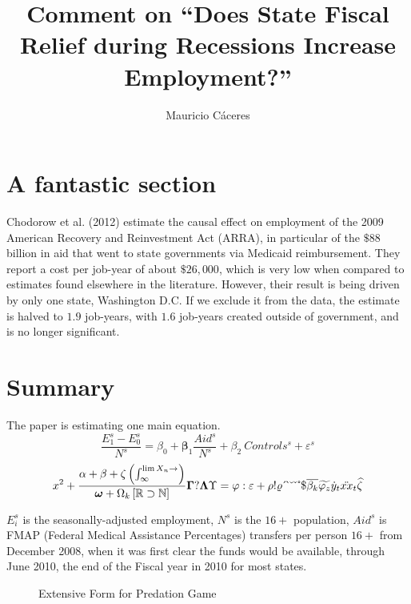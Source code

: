 \documentclass{article}
\title{Comment on ``Does State Fiscal Relief during Recessions Increase Employment?''}
\author{Mauricio C\'aceres}
\begin{document}
\displayoptions

\section{A fantastic section}
\label{sec:a_fantastic_section}

Chodorow et al. (2012) estimate the causal effect on employment of the 2009 American Recovery and Reinvestment Act (ARRA), in particular of the $\$88$ billion in aid that went to state governments via Medicaid reimbursement. They report a cost per job-year of about $\$26,000$, which is very low when compared to estimates found elsewhere in the literature. However, their result is being driven by only one state, Washington D.C. If we exclude it from the data, the estimate is halved to $1.9$ job-years, with $1.6$ job-years created outside of government, and is no longer significant.

\section{Summary}
\label{sec:summary}

The paper is estimating one main equation.
\begin{equation}
  \dfrac{E_1^s - E_0^s}{N^s}
  = \beta_0 + \bm\beta_1 \dfrac{Aid^s}{N^s} + \beta_2 ~ Controls^s + \varepsilon^s
\end{equation}
\[
  x^2 + \dfrac{\alpha + \beta + \zeta \left(\int_{\infty}^{\lim X_n \to \empty}\right)}{\bm \omega + \Omega_k \left[\mathbb{R} \supset \mathbb{N}\right]}
  \bm\Gamma ? \bm\Lambda\Upsilon = \varphi : \varepsilon + \rho ! \varrho
\acute ~ \grave ~ \breve ~ \check ~ \mathring ~ \mathdollar
\overline{\beta_k} \widetilde{\varphi_z} \dot{y}_t \ddot{xx}_t \widehat{\zeta}
\]


$E_i^s$ is the seasonally-adjusted employment, $N^s$ is the $16+$ population, $Aid^s$ is FMAP (Federal Medical Assistance Percentages) transfers per person $16+$ from December 2008, when it was first clear the funds would be available, through June 2010, the end of the Fiscal year in 2010 for most states.

\begin{figure}[!ht]
  \centering
  \caption{Extensive Form for Predation Game}
  \label{fig:extensive_form_for_predation_game}
\end{figure}
\end{document}

